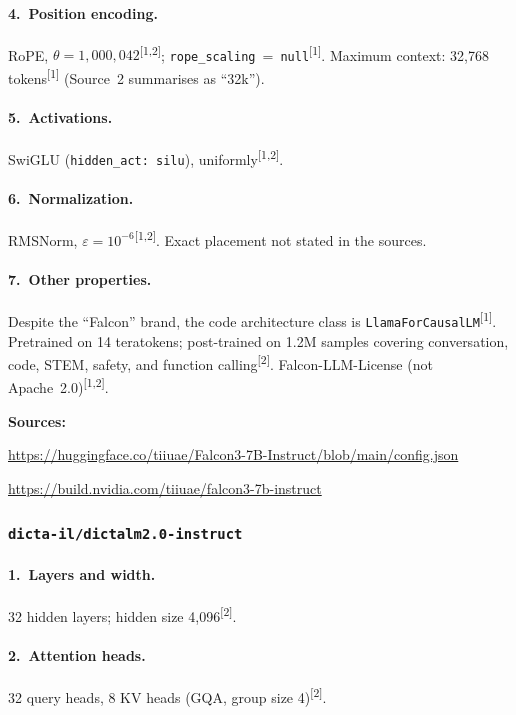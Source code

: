 \documentclass[11pt, a4paper]{article}
\newcommand{\src}[1]{\textsuperscript{\normalfont\small[#1]}}
\begin{document}
\paragraph{4.~Position encoding.}
RoPE, $\theta=1{,}000{,}042$\src{1,2}; \texttt{rope\_scaling}~=~\texttt{null}\src{1}.
Maximum context: 32,768 tokens\src{1} (Source~2 summarises as ``32k'').

\paragraph{5.~Activations.}
SwiGLU (\texttt{hidden\_act: silu}), uniformly\src{1,2}.

\paragraph{6.~Normalization.}
RMSNorm, $\varepsilon=10^{-6}$\src{1,2}.
Exact placement not stated in the sources.

\paragraph{7.~Other properties.}
Despite the ``Falcon'' brand, the code architecture class is
\texttt{LlamaForCausalLM}\src{1}.
Pretrained on 14 teratokens; post-trained on 1.2M samples covering conversation,
code, STEM, safety, and function calling\src{2}.
Falcon-LLM-License (not Apache~2.0)\src{1,2}.

\noindent\textbf{Sources:}
\begin{enumerate}[noitemsep,label=\small{[\arabic*]},leftmargin=*,topsep=2pt]
\item \small\url{https://huggingface.co/tiiuae/Falcon3-7B-Instruct/blob/main/config.json}
\item \small\url{https://build.nvidia.com/tiiuae/falcon3-7b-instruct}
\end{enumerate}

\subsubsection{\texttt{dicta-il/dictalm2.0-instruct}}

\paragraph{1.~Layers and width.}
32 hidden layers; hidden size 4,096\src{2}.

\paragraph{2.~Attention heads.}
32 query heads, 8 KV heads (GQA, group size 4)\src{2}.
\end{document}
